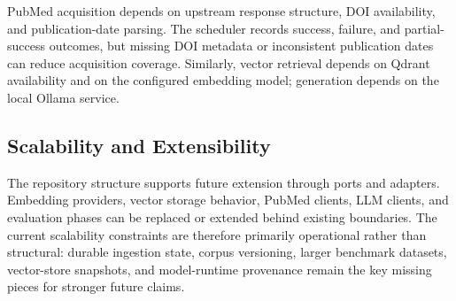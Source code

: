 PubMed acquisition depends on upstream response structure, DOI availability, and publication-date parsing. The scheduler records success, failure, and partial-success outcomes, but missing DOI metadata or inconsistent publication dates can reduce acquisition coverage. Similarly, vector retrieval depends on Qdrant availability and on the configured embedding model; generation depends on the local Ollama service.

\subsection{Scalability and Extensibility}

The repository structure supports future extension through ports and adapters. Embedding providers, vector storage behavior, PubMed clients, LLM clients, and evaluation phases can be replaced or extended behind existing boundaries. The current scalability constraints are therefore primarily operational rather than structural: durable ingestion state, corpus versioning, larger benchmark datasets, vector-store snapshots, and model-runtime provenance remain the key missing pieces for stronger future claims.
